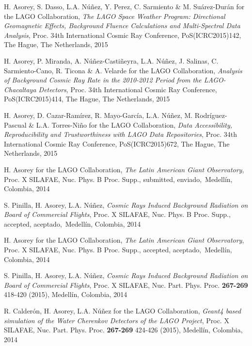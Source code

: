 \begin{etaremune}
\item {}H. Asorey, S. Dasso, L.A. Núñez, Y. Perez, C. Sarmiento \& M. Suárez-Durán for the LAGO Collaboration, {\emph{The LAGO Space Weather Program: Directional Geomagnetic Effects, Background Fluence Calculations and Multi-Spectral Data Analysis}}, \en Proc. 34th International Cosmic Ray Conference, PoS(ICRC2015)142, The Hague, The Netherlands, 2015

\item {}H. Asorey, P. Miranda, A. Núñez-Castiñeyra, L.A. Núñez, J. Salinas, C. Sarmiento-Cano, R. Ticona \& A. Velarde for the LAGO Collaboration, {\emph{Analysis of Background Cosmic Ray Rate in the 2010-2012 Period from the LAGO-Chacaltaya Detectors}}, \en Proc. 34th International Cosmic Ray Conference, PoS(ICRC2015)414, The Hague, The Netherlands, 2015

\item {}H. Asorey, D. Cazar-Ramírez, R. Mayo-García, L.A. Núñez, M. Rodríguez-Pascual \& L.A. Torres-Niño for the LAGO Collaboration, {\emph{Data Accessibility, Reproducibility and Trustworthiness with LAGO Data Repositories}}, \en Proc. 34th International Cosmic Ray Conference, PoS(ICRC2015)672, The Hague, The Netherlands, 2015

\item {}H. Asorey for the LAGO Collaboration, {\emph{The Latin American Giant Observatory}}, \en Proc. X SILAFAE, Nuc. Phys. B Proc. Supp., \ifeng submitted, \else enviado,\fi\ Medellín, Colombia, 2014

\item {}S. Pinilla, H. Asorey, L.A. Núñez, {\emph{Cosmic Rays Induced Background Radiation on Board of Commercial Flights}}, \en Proc. X SILAFAE, Nuc. Phys. B Proc. Supp., \ifeng accepted, \else aceptado,\fi\ Medellín, Colombia, 2014

\item {}H. Asorey for the LAGO Collaboration, {\emph{The Latin American Giant Observatory}}, \en Proc. X SILAFAE, Nuc. Phys. B Proc. Supp., \ifeng accepted, \else aceptado,\fi\ Medellín, Colombia, 2014

\item {}S. Pinilla, H. Asorey, L.A. Núñez, {\emph{Cosmic Rays Induced Background Radiation on Board of Commercial Flights}}, \en Proc. X SILAFAE,  Nuc. Part. Phys. Proc. {\bf{267-269}} 418-420 (2015), Medellín, Colombia, 2014

\item {}R. Calderón, H. Asorey, L.A. Núñez for the LAGO Collaboration, {\emph{Geant4 based simulation of the Water Cherenkov Detectors of the LAGO Project}}, \en Proc. X SILAFAE, Nuc. Part. Phys. Proc. {\bf{267-269}} 424-426 (2015), Medellín, Colombia, 2014


\end{etaremune}

